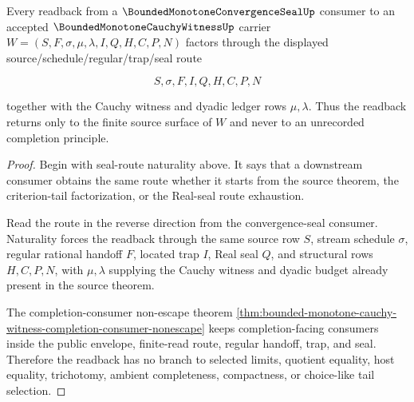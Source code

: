 \begin{theorem}
\label{thm:bounded-monotone-cauchy-witness-convergence-seal-readback}
Every readback from a $\BoundedMonotoneConvergenceSealUp$ consumer to an accepted $\BoundedMonotoneCauchyWitnessUp$ carrier $W=(S,F,\sigma,\mu,\lambda,I,Q,H,C,P,N)$ factors through the displayed source/schedule/regular/trap/seal route

$$
S,\sigma,F,I,Q,H,C,P,N
$$

together with the Cauchy witness and dyadic ledger rows $\mu,\lambda$. Thus the readback returns only to the finite source surface of $W$ and never to an unrecorded completion principle.
\end{theorem}
\begin{proof}
Begin with seal-route naturality above. It says that a downstream consumer obtains the same route whether it starts from the source theorem, the criterion-tail factorization, or the Real-seal route exhaustion.

Read the route in the reverse direction from the convergence-seal consumer. Naturality forces the readback through the same source row $S$, stream schedule $\sigma$, regular rational handoff $F$, located trap $I$, Real seal $Q$, and structural rows $H,C,P,N$, with $\mu,\lambda$ supplying the Cauchy witness and dyadic budget already present in the source theorem.

The completion-consumer non-escape theorem \autoref{thm:bounded-monotone-cauchy-witness-completion-consumer-nonescape} keeps completion-facing consumers inside the public envelope, finite-read route, regular handoff, trap, and seal. Therefore the readback has no branch to selected limits, quotient equality, host equality, trichotomy, ambient completeness, compactness, or choice-like tail selection.
\end{proof}

